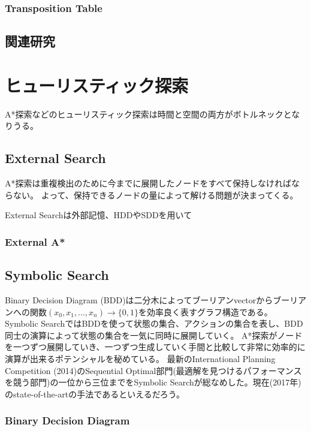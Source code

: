 \documentclass{book}
\begin{document}
\subsection{Transposition Table}

\section{関連研究}

\chapter{ヒューリスティック探索}

A*探索などのヒューリスティック探索は時間と空間の両方がボトルネックとなりうる。


\section{External Search}

A*探索は重複検出のために今までに展開したノードをすべて保持しなければならない。
よって、保持できるノードの量によって解ける問題が決まってくる。

External Searchは外部記憶、HDDやSDDを用いて

\subsection{External A*}


\section{Symbolic Search}

Binary Decision Diagram (BDD)は二分木によってブーリアンvectorからブーリアンへの関数$(x_0,x_1,...,x_n) \rightarrow \{0, 1\}$を効率良く表すグラフ構造である。
Symbolic SearchではBDDを使って状態の集合、アクションの集合を表し、BDD同士の演算によって状態の集合を一気に同時に展開していく。
A*探索がノードを一つずつ展開していき、一つずつ生成していく手間と比較して非常に効率的に演算が出来るポテンシャルを秘めている。
最新のInternational Planning Competition (2014)のSequential Optimal部門(最適解を見つけるパフォーマンスを競う部門)の一位から三位までをSymbolic Searchが総なめした。現在(2017年)のstate-of-the-artの手法であるといえるだろう。

\subsection{Binary Decision Diagram}
\end{document}

